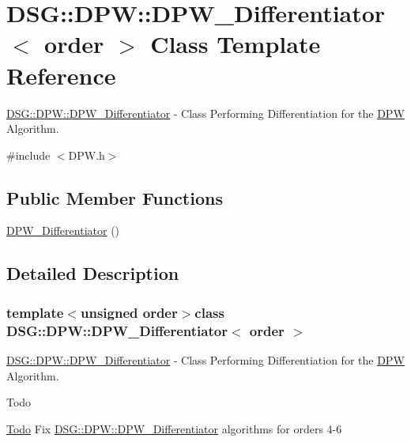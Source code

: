 \hypertarget{class_d_s_g_1_1_d_p_w_1_1_d_p_w___differentiator}{\section{D\+S\+G\+:\+:D\+P\+W\+:\+:D\+P\+W\+\_\+\+Differentiator$<$ order $>$ Class Template Reference}
\label{class_d_s_g_1_1_d_p_w_1_1_d_p_w___differentiator}
}


\hyperlink{class_d_s_g_1_1_d_p_w_1_1_d_p_w___differentiator}{D\+S\+G\+::\+D\+P\+W\+::\+D\+P\+W\+\_\+\+Differentiator} -\/ Class Performing Differentiation for the \hyperlink{namespace_d_s_g_1_1_d_p_w}{D\+P\+W} Algorithm.  




{\ttfamily \#include $<$D\+P\+W.\+h$>$}

\subsection*{Public Member Functions}
\begin{DoxyCompactItemize}
\item 
\hyperlink{class_d_s_g_1_1_d_p_w_1_1_d_p_w___differentiator_acff6769e1c7555fea5e74f1e15bdecd9}{D\+P\+W\+\_\+\+Differentiator} ()
\end{DoxyCompactItemize}


\subsection{Detailed Description}
\subsubsection*{template$<$unsigned order$>$class D\+S\+G\+::\+D\+P\+W\+::\+D\+P\+W\+\_\+\+Differentiator$<$ order $>$}

\hyperlink{class_d_s_g_1_1_d_p_w_1_1_d_p_w___differentiator}{D\+S\+G\+::\+D\+P\+W\+::\+D\+P\+W\+\_\+\+Differentiator} -\/ Class Performing Differentiation for the \hyperlink{namespace_d_s_g_1_1_d_p_w}{D\+P\+W} Algorithm. 

\begin{DoxyRefDesc}{Todo}
\item[\hyperlink{todo__todo000005}{Todo}]Fix \hyperlink{class_d_s_g_1_1_d_p_w_1_1_d_p_w___differentiator}{D\+S\+G\+::\+D\+P\+W\+::\+D\+P\+W\+\_\+\+Differentiator} algorithms for orders 4-\/6 \end{DoxyRefDesc}


